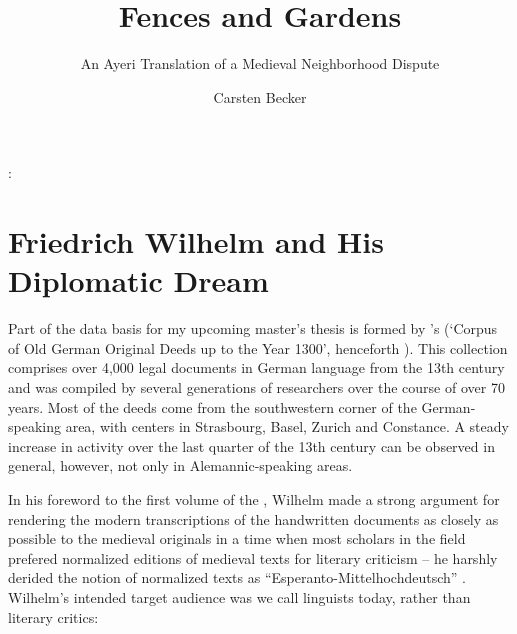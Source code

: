 \documentclass[12pt,paper=a4]{scrartcl}
\author{Carsten Becker}
\title{Fences and Gardens}
\subtitle{An Ayeri Translation of a Medieval Neighborhood Dispute}
\newenvironment{mytitle}{
    \hfill
    \begin{minipage}{0.667\textwidth}
	\vspace{\baselineskip}
	\begin{center}
	    \Large
	    \sffamily\bfseries
	    \makeatletter
}{
	    \makeatother
	\end{center}
	\vspace{1em}
    \end{minipage}
    \hfill
}
\begin{document}

\begin{mytitle}
    \@title: \@subtitle
\end{mytitle}

\section{Friedrich Wilhelm and His Diplomatic Dream}
Part of the data basis for my upcoming master's thesis is formed by \citeauthor{CAO}'s  (\enquote*{Corpus of Old German Original Deeds up to the Year 1300}, henceforth ). This collection comprises over 4,000 legal documents in German language from the 13th century and was compiled by several generations of researchers over the course of over 70 years. Most of the deeds come from the southwestern corner of the German-speaking area, with centers in Strasbourg, Basel, Zurich and Constance. A steady increase in activity over the last quarter of the 13th century can be observed in general, however, not only in Alemannic-speaking areas.

In his foreword to the first volume of the , Wilhelm made a strong argument for rendering the modern transcriptions of the handwritten documents as closely as possible to the medieval originals in a time when most scholars in the field prefered normalized editions of medieval texts for literary criticism – he harshly derided the notion of normalized texts as \enquote{Esperanto-Mittelhochdeutsch} \autocite[see][VIII--IX]{CAO1}. Wilhelm's intended target audience was we call linguists today, rather than literary critics:
\end{document}

